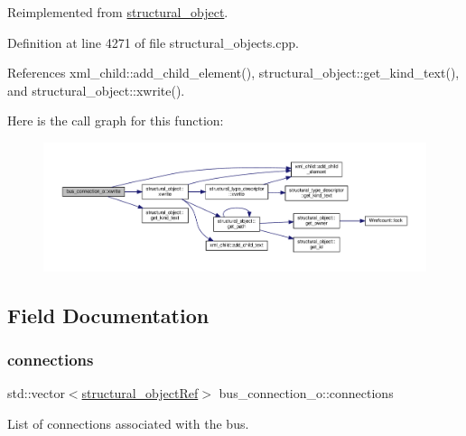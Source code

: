 Reimplemented from \hyperlink{classstructural__object_a7b0b509094451578b2dc10a9b716b16e}{structural\+\_\+object}.



Definition at line 4271 of file structural\+\_\+objects.\+cpp.



References xml\+\_\+child\+::add\+\_\+child\+\_\+element(), structural\+\_\+object\+::get\+\_\+kind\+\_\+text(), and structural\+\_\+object\+::xwrite().

Here is the call graph for this function\+:
\nopagebreak
\begin{figure}[H]
\begin{center}
\leavevmode
\includegraphics[width=350pt]{d3/dfb/classbus__connection__o_acb507e284b971944f09b6b26264dc0cf_cgraph}
\end{center}
\end{figure}


\subsection{Field Documentation}
\mbox{\label{classbus__connection__o_a72b5be48a9e1b6383fe7283d87e99aa7}} 
\subsubsection{\texorpdfstring{connections}{connections}}
{\footnotesize\ttfamily std\+::vector$<$\hyperlink{structural__objects_8hpp_a8ea5f8cc50ab8f4c31e2751074ff60b2}{structural\+\_\+object\+Ref}$>$ bus\+\_\+connection\+\_\+o\+::connections\hspace{0.3cm}{\ttfamily [private]}}



List of connections associated with the bus. 



